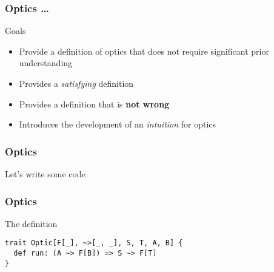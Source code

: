 \begin{frame}[fragile]
\frametitle{Optics \ldots}
\begin{block}{Goals}
\begin{center}
\begin{itemize}
  \item<1-> Provide a definition of optics that does not require significant prior understanding
  \item<2-> Provides a \emph{satisfying} definition
  \item<3-> Provides a definition that is \textbf{not wrong}
  \item<4-> Introduces the development of an \emph{intuition} for optics
\end{itemize}
\end{center}
\end{block}
\end{frame}

\begin{frame}[fragile]
\frametitle{Optics}
\begin{center}
Let's write some code
\end{center}
\end{frame}

\begin{frame}[fragile]
\frametitle{Optics}
\begin{block}{The definition}
\begin{center}
\begin{lstlisting}[style=scala]
trait Optic[F[_], ~>[_, _], S, T, A, B] {
  def run: (A ~> F[B]) => S ~> F[T]
}
\end{lstlisting}
\end{center}
\end{block}
\end{frame}
